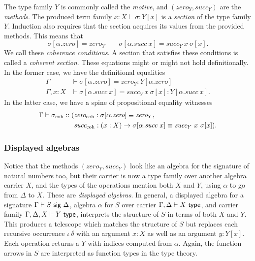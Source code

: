 The type family $Y$ is commonly called the \emph{motive}, and $(\textit{zero}_Y,
\textit{succ}_Y)$ are the \emph{methods}. The produced term family $x : X \vdash
\sigma : Y[x]$ is a \emph{section} of the type family $Y$. Induction also
requires that the section acquires its values from the provided methods. This
means that
\[
\sigma[\alpha.\textit{zero}] = \textit{zero}_Y \qquad \sigma
[\alpha.\textit{succ}\ x] = \textit{succ}_Y\ x\ \sigma[x].
\]
We call these \emph{coherence conditions}. A section that satisfies these
conditions is called a \emph{coherent section}. These equations might or might
not hold definitionally. In the former case, we have the definitional equalities
\begin{align*}
\Gamma &\vdash \sigma[\alpha.\textit{zero}] = \textit{zero}_Y : Y[\alpha.\textit{zero}] \\
\Gamma, x : X &\vdash \sigma[\alpha.\textit{succ}\ x] = \textit{succ}_Y\ x\ \sigma[x] : Y[\alpha.\textit{succ}\ x].
\end{align*}
In the latter case, we have a spine of propositional equality witnesses
\begin{align*}
\Gamma \vdash \sigma_{\text{coh}} :: (&\textit{zero}_{\text{coh}} :
\sigma[\alpha.\textit{zero}] \equiv \textit{zero}_Y, \\
&\textit{succ}_{\text{coh}} : (x : X) \to \sigma[\alpha.\textit{succ}\ x] \equiv
\textit{succ}_Y\ x\ \sigma[x]).
\end{align*}

\subsubsection{Displayed algebras}

Notice that the methods $(\textit{zero}_Y, \textit{succ}_Y)$ look like an
algebra for the signature of natural numbers too, but their carrier is now a
type family over another algebra carrier $X$, and the types of the operations
mention both $X$ and $Y$, using $\alpha$ to go from $\Delta$ to $X$. These are
\emph{displayed algebras}. In general, a displayed algebra for a signature
$\Gamma \vdash S \ \textsf{sig}\  \Delta$, algebra $\alpha$ for $S$ over carrier $\Gamma,
\Delta \vdash X \ \textsf{type}$, and carrier family $\Gamma, \Delta, X \vdash Y \ \textsf{type}$,
interprets the structure of $S$ in terms of both $X$ and $Y$. This produces a
telescope which matches the structure of $S$ but replaces each recursive
occurrence $\iota\ \delta$ with an argument $x : X$ as well as an argument $y :
Y[x]$. Each operation returns a $Y$ with indices computed from $\alpha$. Again,
the function arrows in $S$ are interpreted as function types in the type theory.

